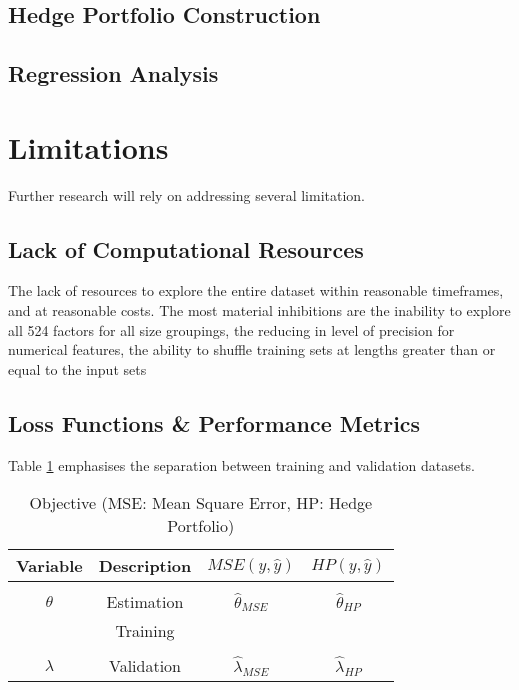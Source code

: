 \documentclass[10pt]{article}
\begin{document}
\subsection{Hedge Portfolio Construction}
\subsection{Regression Analysis}
\newpage
\section{Limitations}
Further research will rely on addressing several limitation.
\subsection{Lack of Computational Resources}
The lack of resources to explore the entire dataset within reasonable timeframes, and at reasonable costs.
The most material inhibitions are the inability to explore all 524 factors for all size groupings, the reducing in level of precision for numerical features, 
the ability to shuffle training sets at lengths greater than or equal to the input sets  
\subsection{Loss Functions \& Performance Metrics}
Table \ref{hpt} emphasises the separation between training and validation datasets.
	\begin{table}[H]
		\centering
		\begin{tabular}{||c|c|c|c||}
			\hline
			Variable & Description & $ MSE(y,\hat{y}) $ & $ HP(y,\hat{y}) $\\ [0.5ex]
			\hline
			&&&\\
			$\theta$ & Estimation& $ \hat{\theta}_{MSE}$& $ \hat{\theta}_{HP}$ \\ [0.5ex]
			& Training & & \\
			\hline
			&&&\\
			$\lambda$ & Validation & $\hat{\lambda}_{MSE}$ & $\hat{\lambda}_{HP}$\\ [1.0ex]
			\hline
		\end{tabular}
	\caption{Objective (MSE: Mean Square Error, HP: Hedge Portfolio)}
	\label{hpt}
\end{table}
\end{document}
